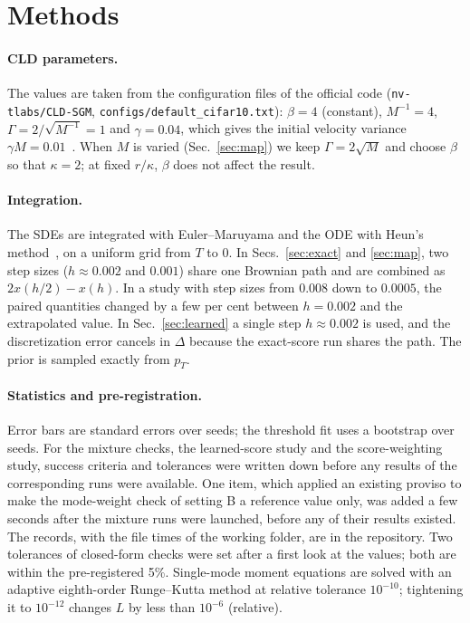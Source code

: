 \section{Methods}
\label{app:methods}

\paragraph*{CLD parameters.}
The values are taken from the configuration files of the official code (\texttt{nv-tlabs/CLD-SGM}, \texttt{configs/default\_cifar10.txt}): $\beta=4$ (constant), $M^{-1}=4$, $\Gamma=2/\sqrt{M^{-1}}=1$ and $\gamma=0.04$, which gives the initial velocity variance $\gamma M = 0.01$~\cite{dockhorn2022cld}.
When $M$ is varied (Sec.~\ref{sec:map}) we keep $\Gamma=2\sqrt M$ and choose $\beta$ so that $\kappa=2$; at fixed $r/\kappa$, $\beta$ does not affect the result.

\paragraph*{Integration.}
The SDEs are integrated with Euler--Maruyama and the ODE with Heun's method~\cite{kloeden1992numerical}, on a uniform grid from $T$ to $0$.
In Secs.~\ref{sec:exact} and \ref{sec:map}, two step sizes ($h\approx0.002$ and $0.001$) share one Brownian path and are combined as $2x(h/2)-x(h)$.
In a study with step sizes from $0.008$ down to $0.0005$, the paired quantities changed by a few per cent between $h=0.002$ and the extrapolated value.
In Sec.~\ref{sec:learned} a single step $h\approx0.002$ is used, and the discretization error cancels in $\Delta$ because the exact-score run shares the path.
The prior is sampled exactly from $p_T$.

\paragraph*{Statistics and pre-registration.}
Error bars are standard errors over seeds; the threshold fit uses a bootstrap over seeds.
For the mixture checks, the learned-score study and the score-weighting study, success criteria and tolerances were written down before any results of the corresponding runs were available. One item, which applied an existing proviso to make the mode-weight check of setting B a reference value only, was added a few seconds after the mixture runs were launched, before any of their results existed. The records, with the file times of the working folder, are in the repository.
Two tolerances of closed-form checks were set after a first look at the values; both are within the pre-registered 5\%.
Single-mode moment equations are solved with an adaptive eighth-order Runge--Kutta method at relative tolerance $10^{-10}$; tightening it to $10^{-12}$ changes $L$ by less than $10^{-6}$ (relative).
